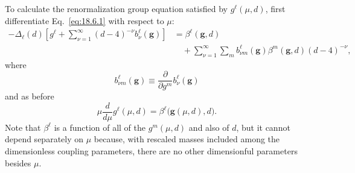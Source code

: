 To calculate the renormalization group equation satisfied by $g^\ell(\mu,d)$, first differentiate Eq.~\eqref{eq:18.6.1} with respect to $\mu$:
\begin{equation}
\begin{aligned}
-\Delta_\ell(d)
\left[g^\ell+\sum_{\nu=1}^{\infty}(d-4)^{-\nu}b_\nu^\ell(\mathbf{g})\right]
&=\beta^\ell(\mathbf{g},d)\\
&\quad+\sum_{\nu=1}^{\infty}\sum_m b_{\nu m}^\ell(\mathbf{g})
\beta^m(\mathbf{g},d)(d-4)^{-\nu},
\end{aligned}
\tag{18.6.2}\label{eq:18.6.2}
\end{equation}
where
\begin{equation}
b_{\nu m}^\ell(\mathbf{g})\equiv
\frac{\partial}{\partial g^m}b_\nu^\ell(\mathbf{g})
\tag{18.6.3}\label{eq:18.6.3}
\end{equation}
and as before
\begin{equation}
\mu\frac{d}{d\mu}g^\ell(\mu,d)
=\beta^\ell\bigl(\mathbf{g}(\mu,d),d\bigr).
\tag{18.6.4}\label{eq:18.6.4}
\end{equation}
Note that $\beta^\ell$ is a function of all of the $g^m(\mu,d)$ and also of $d$, but it cannot depend separately on $\mu$ because, with rescaled masses included among the dimensionless coupling parameters, there are no other dimensionful parameters besides $\mu$.

